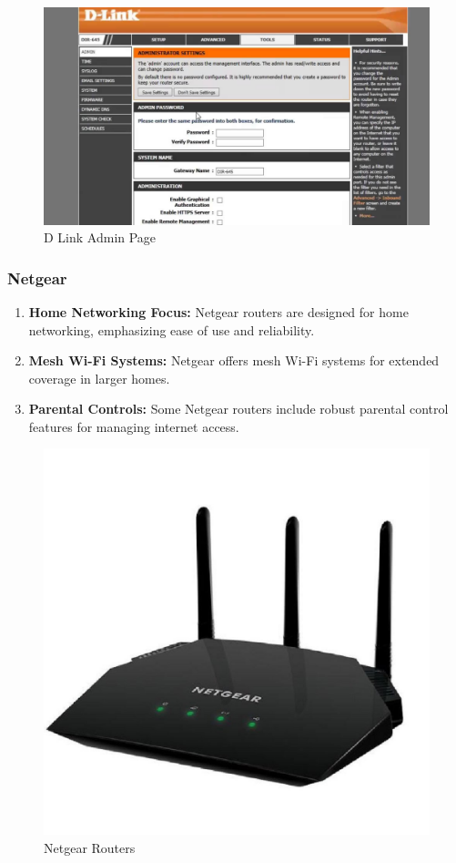 \documentclass[11pt]{article}
\begin{document}
\begin{figure}[H]
  \centering
  \includegraphics[width=.95\textwidth]{dlink admin page/dlink admin page_3.jpg}
  \caption{D Link Admin Page}
\end{figure}

\subsubsection{Netgear}
\begin{enumerate}
  \item \textbf{Home Networking Focus:} Netgear routers are designed for home networking, emphasizing ease of use and reliability.

  \item \textbf{Mesh Wi-Fi Systems:} Netgear offers mesh Wi-Fi systems for extended coverage in larger homes.

  \item \textbf{Parental Controls:} Some Netgear routers include robust parental control features for managing internet access.
\end{enumerate}

\begin{figure}[H]
  \centering
  \includegraphics[width=.45\textwidth]{netgear routers/netgear routers_8.jpg}
  \caption{Netgear Routers}
\end{figure}
\end{document}

